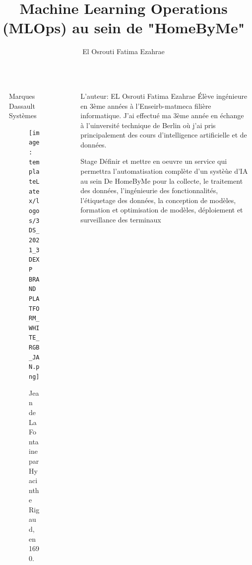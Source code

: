\documentclass{ENSEIRB_poster}
\title{Machine Learning Operations (MLOps) au sein de "HomeByMe"}
\author{El Osrouti Fatima Ezahrae}
\begin{document}
\begin{frame}[t] %


  \begin{columns}[c] 
    \begin{column}{\sepwidth}\end{column} %

    \begin{column}{\threecolwidth}
      \begin{block}{Marques Dassault Systèmes}
        \begin{figure}
          \texttt{[image: templateLatex/logos/3DS\_2021\_3DEXP BRAND PLATFORM\_WHITE\_RGB\_JAN.png]}
          \caption{Jean de La Fontaine par Hyacinthe Rigaud, en 1690.}
        \end{figure}
      \end{block}
    \end{column}

    \begin{column}{\sepwidth}\end{column} %

    \begin{column}{\twothirdcolwidth}
      \begin{alertblock}{L'auteur: EL Osrouti Fatima Ezahrae}
        Élève ingénieure en 3ème années à l'Enseirb-matmeca filière informatique. J'ai effectué ma 3ème année en échange à l'uinversité technique de Berlin où j'ai pris principalement des cours d'intelligence artificielle et de données.
      \end{alertblock}
      
      \begin{block}{Stage}
        Définir et mettre en oeuvre un service qui permettra l'automatisation complète d'un systèùe d'IA au sein De HomeByMe pour la collecte, le traitement des données, l'ingénieurie des fonctionnalités, l'étiquetage des données, la conception de modèles, formation et optimisation de modèles, déploiement et surveillance des terminaux
      \end{block}
    \end{column}


\end{columns}
\end{frame}
\end{document}
